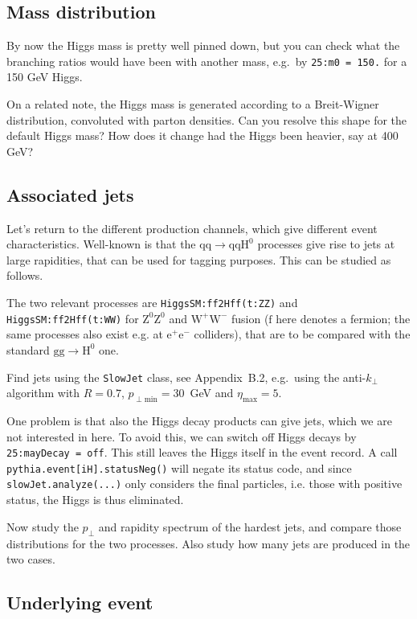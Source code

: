 \documentclass[12pt,a4paper]{article}
\newcommand{\pT}{p_{\perp}}
\newcommand{\e}{{\mathrm e}}
\newcommand{\f}{{\mathrm f}}
\newcommand{\g}{{\mathrm g}}
\newcommand{\q}{{\mathrm q}}
\renewcommand{\H}{{\mathrm H}}
\newcommand{\W}{{\mathrm W}}
\newcommand{\Z}{{\mathrm Z}}
\begin{document}
\subsection{Mass distribution}

By now the Higgs mass is pretty well pinned down, but you can 
check what the branching ratios would have been with another mass,
e.g.\ by \texttt{25:m0 = 150.} for a 150 GeV Higgs.

On a related note, the Higgs mass is generated according to a 
Breit-Wigner distribution, convoluted with parton densities.
Can you resolve this shape for the default Higgs mass?
How does it change had the Higgs been heavier, say at 400 GeV? 

\subsection{Associated jets}
\label{sec:Hjets}

Let's return to the different production channels, which 
give different event characteristics. Well-known is that the 
$\q \q \to \q \q \H^0$ processes give rise to jets at large
rapidities, that can be used for tagging purposes. This can be
studied as follows.

The two relevant processes are \texttt{HiggsSM:ff2Hff(t:ZZ)} and
\texttt{HiggsSM:ff2Hff(t:WW)} for $\Z^0 \Z^0$ and $\W^+ \W^-$
fusion ($\f$ here denotes a fermion; the same processes also exist
e.g. at $\e^+ \e^-$ colliders), that are to be compared with
the standard $\g\g \to \H^0$ one.

Find jets using the \texttt{SlowJet} class, see Appendix~B.2,
e.g.\ using the anti-$k_{\perp}$ algorithm with $R = 0.7$, 
$p_{\perp\mathrm{min}} = 30$~GeV and $\eta_{\mathrm{max}} = 5$.

One problem is that also the Higgs decay products can give jets, which
we are not interested in here. To avoid this, we can switch off Higgs 
decays by \texttt{25:mayDecay = off}. This still leaves the Higgs itself
in the event record. A call 
\texttt{pythia.event[iH].statusNeg()} will negate its status code, 
and since \texttt{slowJet.analyze(...)} only considers the final 
particles, i.e. those with positive status, the Higgs is thus
eliminated. 

Now study the $\pT$ and rapidity spectrum of the hardest jets,
and compare those distributions for the two processes. Also study
how many jets are produced in the two cases.

\subsection{Underlying event}
\end{document}
